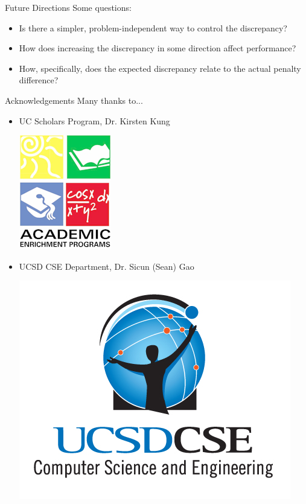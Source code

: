\documentclass{beamer}
\begin{document}
\begin{frame}{Future Directions}
    Some questions:
    \begin{itemize}
        \item Is there a simpler, problem-independent way to control the
            discrepancy?
        \item How does increasing the discrepancy in some direction affect
            performance?
        \item How, specifically, does the expected discrepancy relate to the
            actual penalty difference?
    \end{itemize}
\end{frame}

\begin{frame}{Acknowledgements}
Many thanks to...
\begin{itemize}
    \item UC Scholars Program, Dr. Kirsten Kung\\
        \begin{center}
            \includegraphics[scale=0.3]{aep-logo-2.jpg}
        \end{center}
    \item UCSD CSE Department, Dr. Sicun (Sean) Gao\\
        \begin{center}
            \includegraphics[scale=0.7]{cse_logo.jpg}
        \end{center}
\end{itemize}
\end{frame}
\end{document}
